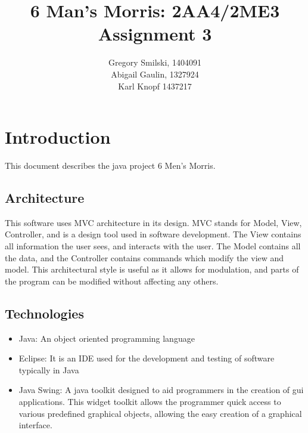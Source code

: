 \documentclass[12pt]{article}
\begin{document}
	\title{6 Man's Morris: 2AA4/2ME3 Assignment 3} %
	\author{
		Gregory Smilski, 1404091\\
		Abigail Gaulin, 1327924\\
		Karl Knopf 1437217} 
	
	\maketitle
	\thispagestyle{empty}
	\newpage
	\tableofcontents
	\newpage
	
	\section{Introduction}
	This document describes the java project 6 Men's Morris. 
	\subsection{Architecture}
	\begin{figure}[!h]
		\centering
	\end{figure}
	This software uses MVC architecture in its design. MVC stands for Model, View, Controller, and is a design tool used in software development. The View contains all information the user sees, and interacts with the user. The Model contains all the data, and the Controller contains commands which modify the view and model. This architectural style is useful as it allows for modulation, and parts of the program can be modified without affecting any others.
	\subsection{Technologies}
	\begin{itemize}
		\item Java:  An object oriented programming language 
		\item Eclipse: It is an IDE used for the development and testing of software typically in Java
		\item Java Swing: A java toolkit designed to aid programmers in the creation of gui applications. This widget toolkit allows the programmer quick access to various predefined graphical objects, allowing the easy creation of a graphical interface.
		
	\end{itemize}
\end{document}
